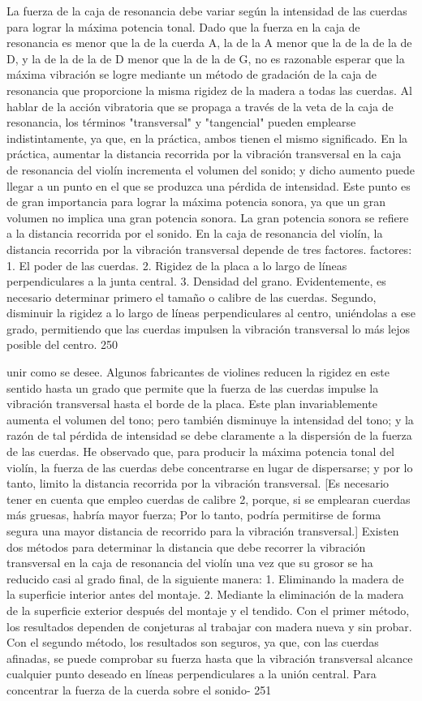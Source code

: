 La fuerza de la caja de resonancia debe variar según la intensidad de las cuerdas para lograr la máxima potencia tonal. Dado que la fuerza en la caja de resonancia es menor que la de la cuerda A, la de la A menor que la de la de la de D, y la de la de la de D menor que la de la de G, no es razonable esperar que la máxima vibración se logre mediante un método de gradación de la caja de resonancia que proporcione la misma rigidez de la madera a todas las cuerdas.
Al hablar de la acción vibratoria que se propaga a través de la veta de la caja de resonancia, los términos "transversal" y "tangencial" pueden emplearse indistintamente, ya que, en la práctica, ambos tienen el mismo significado. En la práctica, aumentar la distancia recorrida por la vibración transversal en la caja de resonancia del violín incrementa el volumen del sonido; y dicho aumento puede llegar a un punto en el que se produzca una pérdida de intensidad. Este punto es de gran importancia para lograr la máxima potencia sonora, ya que un gran volumen no implica una gran potencia sonora. La gran potencia sonora se refiere a la distancia recorrida por el sonido. En la caja de resonancia del violín, la distancia recorrida por la vibración transversal depende de tres factores.
factores:
1. El poder de las cuerdas.
2. Rigidez de la placa a lo largo de líneas perpendiculares a la junta central.
3. Densidad del grano.
Evidentemente, es necesario determinar primero el tamaño o calibre de las cuerdas. Segundo, disminuir la rigidez a lo largo de líneas perpendiculares al centro, uniéndolas a ese grado, permitiendo que las cuerdas impulsen la vibración transversal lo más lejos posible del centro.
250

unir como se desee. Algunos fabricantes de violines reducen la rigidez en este sentido hasta un grado que permite que la fuerza de las cuerdas impulse la vibración transversal hasta el borde de la placa. Este plan invariablemente aumenta el volumen del tono; pero también disminuye la intensidad del tono; y la razón de tal pérdida de intensidad se debe claramente a la dispersión de la fuerza de las cuerdas. He observado que, para producir la máxima potencia tonal del violín, la fuerza de las cuerdas debe concentrarse en lugar de dispersarse; y por lo tanto, limito la distancia recorrida por la vibración transversal. [Es necesario tener en cuenta que empleo cuerdas de calibre 2, porque, si se emplearan cuerdas más gruesas, habría mayor fuerza;
Por lo tanto, podría permitirse de forma segura una mayor distancia de recorrido para la vibración transversal.]
Existen dos métodos para determinar la distancia que debe recorrer la vibración transversal en la caja de resonancia del violín una vez que su grosor se ha reducido casi al grado final, de la siguiente manera:
1. Eliminando la madera de la superficie interior antes del montaje.
2. Mediante la eliminación de la madera de la superficie exterior después del montaje y el tendido.
Con el primer método, los resultados dependen de conjeturas al trabajar con madera nueva y sin probar. Con el segundo método, los resultados son seguros, ya que, con las cuerdas afinadas, se puede comprobar su fuerza hasta que la vibración transversal alcance cualquier punto deseado en líneas perpendiculares a la unión central.
Para concentrar la fuerza de la cuerda sobre el sonido-
251

